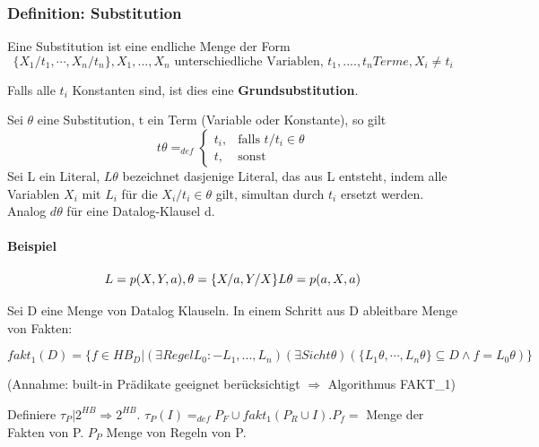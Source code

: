 \documentclass[12pt, a4paper]{article}
\begin{document}
\subsubsection*{Definition: Substitution}
Eine Substitution ist eine endliche Menge der Form
\begin{equation}
\{ X_1 / t_1, \cdots, X_n / t_n \}, X_1,...,X_n \text{ unterschiedliche Variablen, } t_1,....,t_n Terme, X_i \neq t_i
\end{equation}

Falls alle $t_i$ Konstanten sind, ist dies eine \textbf{Grundsubstitution}.

Sei $\theta$ eine Substitution, t ein Term (Variable oder Konstante), so gilt \\

\begin{equation}
t\theta =_{def} \begin{cases} t_i, & \mbox{falls } t/t_i \in \theta \\ t, & \mbox{sonst} \end{cases}
\end{equation}
Sei L ein Literal, $L\theta$ bezeichnet dasjenige Literal, das aus L entsteht, indem alle Variablen $X_i$ mit $L_i$ für die $X_i / t_i \in \theta$ gilt, simultan durch $t_i$ ersetzt werden. Analog $d\theta$ für eine Datalog-Klausel d.

\paragraph{Beispiel}

\begin{equation}
L = p(X, Y, a), \theta = \{X / a, Y / X \} \\
L\theta = p(a, X, a)
\end{equation}

Sei D eine Menge von Datalog Klauseln. In einem Schritt aus D ableitbare Menge von Fakten:

\begin{equation}
fakt_1(D) = \{ f \in HB_D | (\exists Regel L_0 :- L_1,...,L_n)(\exists Sicht \theta)(\{ L_1 \theta, \cdots, L_n\theta \} \subseteq D \wedge f = L_0\theta) \}
\end{equation}

(Annahme: built-in Prädikate geeignet berücksichtigt $\Rightarrow$ Algorithmus FAKT\_1)

Definiere $\tau_P | 2^{HB} \Rightarrow 2^{HB}$. $\tau_P(I) =_{def} P_F \cup fakt_1(P_R \cup I)$.$ P_f = $ Menge der Fakten von P. $P_P$ Menge von Regeln von P.
\end{document}
